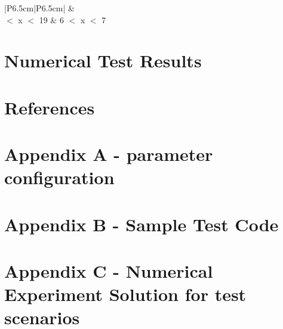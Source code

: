 \documentclass[11pt,letterpaper]{article}
\begin{document}
\begin{table}[H]
	\centering
	\caption{Test B-mix-2 Base Test Acceptance}
	\label{tab:test-B-mix-2base}
	\begin{tabular}{|P{6.5cm}|P{6.5cm}|}
		\hline
		\textbf{} &\textbf{}\\
		 $<$ x $<$ 19 & 6 $<$ x $<$ 7\\
		\hline
	\end{tabular}
\end{table}

\section{Numerical Test Results}


\section{References}


\section*{Appendix A - parameter configuration}

\section*{Appendix B - Sample Test Code }

\section*{Appendix C - Numerical Experiment Solution for test scenarios}
\end{document}
